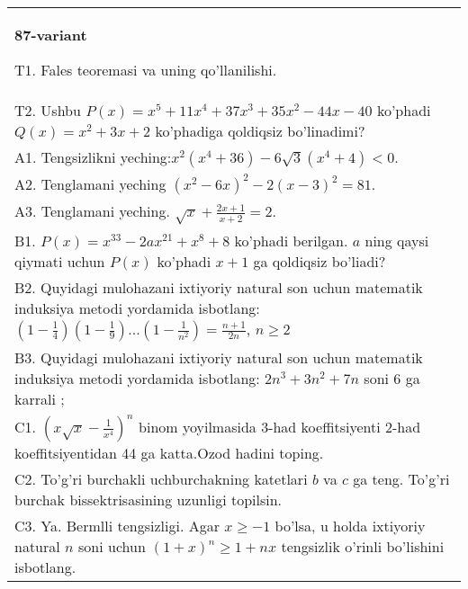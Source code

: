 \documentclass{article}
\begin{document}
\begin{tabular}{m{17cm}}
\textbf{87-variant}
\newline

T1. Fales teoremasi va uning qo'llanilishi. \\
T2. Ushbu \(P(x) = x^{5} + 11x^{4} + 37x^{3} + 35x^{2} - 44x - 40\) ko'phadi \(Q(x) = x^{2} + 3x + 2\) ko'phadiga qoldiqsiz bo'linadimi? \\
A1. Tengsizlikni yeching:\(x^{2}\left( x^{4} + 36 \right) - 6\sqrt{3}\left( x^{4} + 4 \right) < 0\). \\
A2. Tenglamani yeching \(\left( x^{2} - 6x \right)^{2} - 2(x - 3)^{2} = 81\). \\
A3. Tenglamani yeching. \(\sqrt{x} + \frac{2x + 1}{x + 2} = 2\). \\
B1. \(P(x) = x^{33} - 2ax^{21} + x^{8} + 8\) ko'phadi berilgan. \(a\) ning qaysi qiymati uchun \(P(x)\) ko'phadi \(x + 1\) ga qoldiqsiz bo'liadi? \\
B2. Quyidagi mulohazani ixtiyoriy natural son uchun matematik induksiya metodi yordamida isbotlang: \(\left( 1 - \frac{1}{4} \right)\left( 1 - \frac{1}{9} \right)...\left( 1 - \frac{1}{n^{2}} \right) = \frac{n + 1}{2n}\), \(n \geq 2\) \\
B3. Quyidagi mulohazani ixtiyoriy natural son uchun matematik induksiya metodi yordamida isbotlang: \(2n^{3} + 3n^{2} + 7n\) soni 6 ga karrali ; \\
C1. \(\left( x\sqrt{x} - \frac{1}{x^{4}} \right)^{n}\) binom yoyilmasida 3-had koeffitsiyenti 2-had koeffitsiyentidan 44 ga katta.Ozod hadini toping. \\
C2. To'g'ri burchakli uchburchakning katetlari \(b\) va \(c\) ga teng. To'g'ri burchak bissektrisasining uzunligi topilsin. \\
C3. Ya. Bermlli tengsizligi. Agar \(x \geq - 1\) bo'lsa, u holda ixtiyoriy natural \(n\) soni uchun \((1 + x)^{n} \geq 1 + nx\) tengsizlik o'rinli bo'lishini isbotlang. \\

\end{tabular}
\vspace{1cm}
\end{document}
